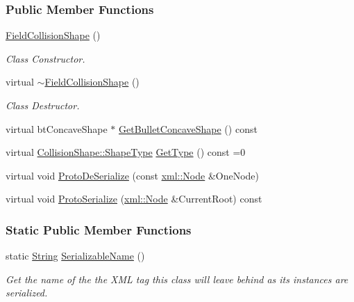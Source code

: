 \subsubsection*{Public Member Functions}
\begin{DoxyCompactItemize}
\item 
\hypertarget{classMezzanine_1_1FieldCollisionShape_a13552192ce6c0133afaee02626b522ba}{
\hyperlink{classMezzanine_1_1FieldCollisionShape_a13552192ce6c0133afaee02626b522ba}{FieldCollisionShape} ()}
\label{classMezzanine_1_1FieldCollisionShape_a13552192ce6c0133afaee02626b522ba}

\begin{DoxyCompactList}\small\item\em Class Constructor. \item\end{DoxyCompactList}\item 
\hypertarget{classMezzanine_1_1FieldCollisionShape_afbead5b5df9bbc2b2e2fe3551c27b302}{
virtual \hyperlink{classMezzanine_1_1FieldCollisionShape_afbead5b5df9bbc2b2e2fe3551c27b302}{$\sim$FieldCollisionShape} ()}
\label{classMezzanine_1_1FieldCollisionShape_afbead5b5df9bbc2b2e2fe3551c27b302}

\begin{DoxyCompactList}\small\item\em Class Destructor. \item\end{DoxyCompactList}\item 
virtual btConcaveShape $\ast$ \hyperlink{classMezzanine_1_1FieldCollisionShape_abd6d91caf9460d289c739d83a3c314a4}{GetBulletConcaveShape} () const 
\item 
virtual \hyperlink{classMezzanine_1_1CollisionShape_ad04186055565998879b64176d6dd100d}{CollisionShape::ShapeType} \hyperlink{classMezzanine_1_1FieldCollisionShape_a85a444fa9bcaca9fec08c3b5697677c9}{GetType} () const =0
\item 
virtual void \hyperlink{classMezzanine_1_1FieldCollisionShape_aa7995de9b5b29693c0d2c57590727bb4}{ProtoDeSerialize} (const \hyperlink{classMezzanine_1_1xml_1_1Node}{xml::Node} \&OneNode)
\item 
virtual void \hyperlink{classMezzanine_1_1FieldCollisionShape_a12c178d2b8ba1219c2be8b31bb59845e}{ProtoSerialize} (\hyperlink{classMezzanine_1_1xml_1_1Node}{xml::Node} \&CurrentRoot) const 
\end{DoxyCompactItemize}
\subsubsection*{Static Public Member Functions}
\begin{DoxyCompactItemize}
\item 
static \hyperlink{namespaceMezzanine_acf9fcc130e6ebf08e3d8491aebcf1c86}{String} \hyperlink{classMezzanine_1_1FieldCollisionShape_a7ac709490aaa938311fd907e35b93bac}{SerializableName} ()
\begin{DoxyCompactList}\small\item\em Get the name of the the XML tag this class will leave behind as its instances are serialized. \item\end{DoxyCompactList}\end{DoxyCompactItemize}
